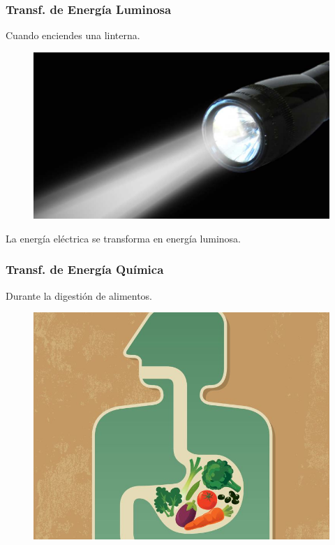 \documentclass[14pt]{beamer}
\begin{document}
\begin{frame}
\frametitle{Transf. de Energía Luminosa}
\vspace*{-1cm}
Cuando enciendes una linterna.
\pause
\begin{figure}
    \centering
    \includegraphics[scale=0.2]{Imagenes/Transformacion_Energia_04.jpg}
\end{figure}
La energía eléctrica se transforma en energía luminosa.
\end{frame}
\begin{frame}
\frametitle{Transf. de Energía Química}
\vspace*{-1cm}
Durante la digestión de alimentos.
\pause
\begin{figure}
    \centering
    \includegraphics[scale=0.25]{Imagenes/Transformacion_Energia_05.jpg}
\end{figure}
\end{frame}
\end{document}
